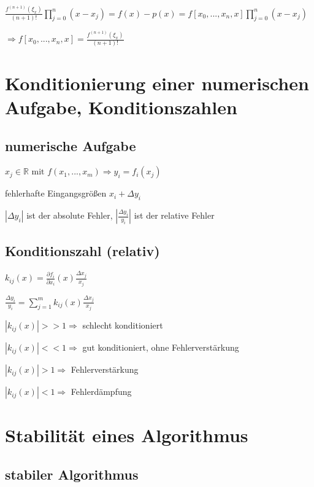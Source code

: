 \documentclass[12pt,a4paper]{article} %
\begin{document}
	$\frac{f^{(n + 1)}(\xi_x)}{(n + 1)!} \prod\limits_{j = 0}^{n} (x-x_j) = f(x) - p(x) = f[x_0, ..., x_n, x] \prod\limits_{j = 0}^{n}(x - x_j)$
	
	$\Rightarrow f[x_0, ..., x_n, x] = \frac{f^{(n + 1)}(\xi_x)}{(n + 1)!}$
	
	\newpage
	
	\section{Konditionierung einer numerischen Aufgabe, Konditionszahlen}
	
	\subsection{numerische Aufgabe}
	
	$x_j \in \mathbb{R} \text{ mit }f(x_1, ..., x_m) \Rightarrow y_i = f_i(x_j)$
	
	fehlerhafte Eingangsgrößen $x_i + \Delta y_i$
	
	$|\Delta y_i|$ ist der absolute Fehler, $|\frac{\Delta y_i}{y_i}|$ ist der relative Fehler
	
	\subsection{Konditionszahl (relativ)}
	
	$k_{ij}(x) = \frac{\partial f_i}{\partial x_i}(x) \frac{\Delta x_j}{x_j}$
	
	$\frac{\Delta y_i}{y_i} = \sum\limits_{j = 1}^{m}k_{ij}(x)\frac{\Delta x_j}{x_j}$
	
	$|k_{ij}(x)| >> 1 \Rightarrow$ schlecht konditioniert
	
	$|k_{ij}(x)| << 1 \Rightarrow$ gut konditioniert, ohne Fehlerverstärkung
	
	$|k_{ij}(x)| > 1 \Rightarrow$ Fehlerverstärkung
	
	$|k_{ij}(x)| < 1 \Rightarrow$ Fehlerdämpfung
	
	\newpage
	
	\section{Stabilität eines Algorithmus}
	
	\subsection{stabiler Algorithmus}
	
\end{document}
